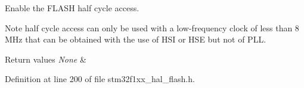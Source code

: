 Enable the F\+L\+A\+SH half cycle access. 

\begin{DoxyNote}{Note}
half cycle access can only be used with a low-\/frequency clock of less than 8 M\+Hz that can be obtained with the use of H\+SI or H\+SE but not of P\+LL. 
\end{DoxyNote}

\begin{DoxyRetVals}{Return values}
{\em None} & \\
\hline
\end{DoxyRetVals}


Definition at line 200 of file stm32f1xx\+\_\+hal\+\_\+flash.\+h.

